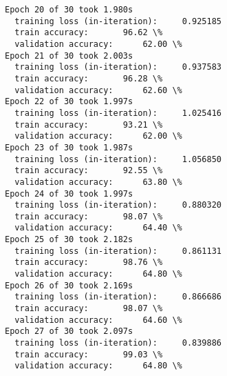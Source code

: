 \documentclass{article}
\begin{document}
\begin{Verbatim}[commandchars=\\\{\}]
Epoch 20 of 30 took 1.980s
  training loss (in-iteration):		0.925185
  train accuracy:		96.62 \%
  validation accuracy:		62.00 \%
Epoch 21 of 30 took 2.003s
  training loss (in-iteration):		0.937583
  train accuracy:		96.28 \%
  validation accuracy:		62.60 \%
Epoch 22 of 30 took 1.997s
  training loss (in-iteration):		1.025416
  train accuracy:		93.21 \%
  validation accuracy:		62.00 \%
Epoch 23 of 30 took 1.987s
  training loss (in-iteration):		1.056850
  train accuracy:		92.55 \%
  validation accuracy:		63.80 \%
Epoch 24 of 30 took 1.997s
  training loss (in-iteration):		0.880320
  train accuracy:		98.07 \%
  validation accuracy:		64.40 \%
Epoch 25 of 30 took 2.182s
  training loss (in-iteration):		0.861131
  train accuracy:		98.76 \%
  validation accuracy:		64.80 \%
Epoch 26 of 30 took 2.169s
  training loss (in-iteration):		0.866686
  train accuracy:		98.07 \%
  validation accuracy:		64.60 \%
Epoch 27 of 30 took 2.097s
  training loss (in-iteration):		0.839886
  train accuracy:		99.03 \%
  validation accuracy:		64.80 \%
    \end{Verbatim}
\end{document}
